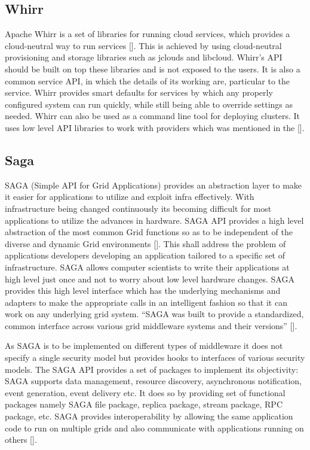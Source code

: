 \subsection{Whirr}
     
Apache Whirr is a set of libraries for running cloud services, which
provides a cloud-neutral way to run
services [\cite{www-ApacheWhirr}]. This is achieved by using
cloud-neutral provisioning and storage libraries such as jclouds and
libcloud. Whirr's API should be built on top these libraries and is
not exposed to the users. It is also a common service API, in which
the details of its working are, particular to the service.  Whirr
provides smart defaults for services by which any properly configured
system can run quickly, while still being able to override settings as
needed. Whirr can also be used as a command line tool for deploying
clusters. It uses low level API libraries to work with providers which
was mentioned in the [\cite{www-slideshare-ApacheWhirr}].

     
\subsection{Saga}

SAGA (Simple API for Grid Applications) provides an abstraction layer
to make it easier for applications to utilize and exploit infra
effectively. With infrastructure being changed continuously its
becoming difficult for most applications to utilize the advances in
hardware. SAGA API provides a high level abstraction of the most
common Grid functions so as to be independent of the diverse and
dynamic Grid environments [\cite{saga-paper}]. This shall address the
problem of applications developers developing an application tailored
to a specific set of infrastructure.  SAGA allows computer scientists
to write their applications at high level just once and not to worry
about low level hardware changes. SAGA provides this high level
interface which has the underlying mechanisms and adapters to make the
appropriate calls in an intelligent fashion so that it can work on any
underlying grid system. ``SAGA was built to provide a standardized,
common interface across various grid middleware systems and their
versions'' [\cite{www-saga-ogf-document}].

As SAGA is to be implemented on different types of middleware it does
not specify a single security model but provides hooks to interfaces
of various security models. The SAGA API provides a set of packages to
implement its objectivity: SAGA supports data management, resource
discovery, asynchronous notification, event generation, event delivery
etc. It does so by providing set of functional packages namely SAGA
file package, replica package, stream package, RPC package, etc. SAGA
provides interoperability by allowing the same application code to run
on multiple grids and also communicate with applications running on
others [\cite{saga-paper}].

